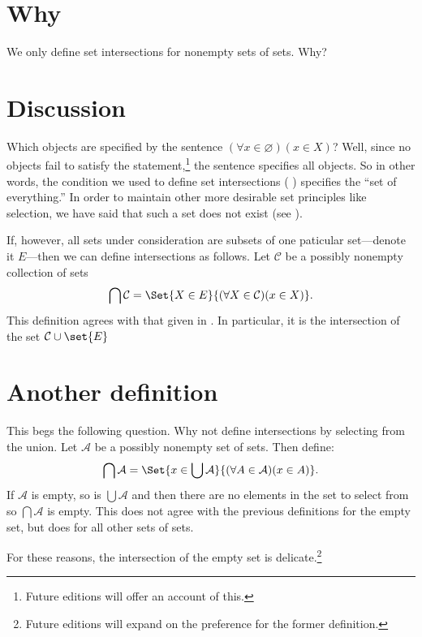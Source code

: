
\section*{Why}

We only define set intersections for nonempty sets of sets.
Why?

\section*{Discussion}

Which objects are specified by the sentence $(\forall x \in \varnothing)(x \in X)$?
Well, since no objects fail to satisfy the statement,\footnote{Future editions will offer an account of this.}
the sentence specifies all objects.
So in other words, the condition we used to define set intersections ( ) specifies the ``set of everything.''
In order to maintain other more desirable set principles like selection, we have said that such a set does not exist (see ).

If, however, all sets under consideration are subsets of one paticular set---denote it $E$---then we can define intersections as follows.
Let $\mathcal{C} $ be a possibly nonempty collection of sets
\[
\bigcap \mathcal{C}  = \Set{X \in E}{(\forall X \in \mathcal{C} )(x \in X)}.
\]
This definition agrees with that given in .
In particular, it is the intersection of the set $\mathcal{C} \cup \set{E}$

\section*{Another definition}

This begs the following question.
Why not define intersections by selecting from the union.
Let $\mathcal{A} $ be a possibly nonempty set of sets.
Then define:
\[
\bigcap \mathcal{A}  = \Set{x \in \bigcup \mathcal{A} }{(\forall A \in \mathcal{A} )(x \in A)}.
\]
If $\mathcal{A} $ is empty, so is $\bigcup \mathcal{A} $ and then there are no elements in the set to select from so $\bigcap \mathcal{A} $ is empty.
This does not agree with the previous definitions for the empty set, but does for all other sets of sets.

For these reasons, the intersection of the empty set is delicate.\footnote{Future editions will expand on the preference for the former definition.}
